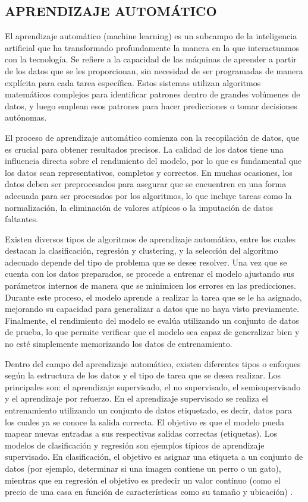\subsection{APRENDIZAJE AUTOMÁTICO}

El aprendizaje automático (machine learning) es un subcampo de la inteligencia artificial que ha transformado profundamente la manera en la que interactuamos con la tecnología. Se refiere a la capacidad de las máquinas de aprender a partir de los datos que se les proporcionan, sin necesidad de ser programadas de manera explícita para cada tarea específica. Estos sistemas utilizan algoritmos matemáticos complejos para identificar patrones dentro de grandes volúmenes de datos, y luego emplean esos patrones para hacer predicciones o tomar decisiones autónomas.

El proceso de aprendizaje automático comienza con la recopilación de datos, que es crucial para obtener resultados precisos. La calidad de los datos tiene una influencia directa sobre el rendimiento del modelo, por lo que es fundamental que los datos sean representativos, completos y correctos. En muchas ocasiones, los datos deben ser preprocesados para asegurar que se encuentren en una forma adecuada para ser procesados por los algoritmos, lo que incluye tareas como la normalización, la eliminación de valores atípicos o la imputación de datos faltantes.

Existen diversos tipos de algoritmos de aprendizaje automático, entre los cuales destacan la clasificación, regresión y clustering, y la selección del algoritmo adecuado depende del tipo de problema que se desee resolver. Una vez que se cuenta con los datos preparados, se procede a entrenar el modelo ajustando sus parámetros internos de manera que se minimicen los errores en las predicciones. Durante este proceso, el modelo aprende a realizar la tarea que se le ha asignado, mejorando su capacidad para generalizar a datos que no haya visto previamente. Finalmente, el rendimiento del modelo se evalúa utilizando un conjunto de datos de prueba, lo que permite verificar que el modelo sea capaz de generalizar bien y no esté simplemente memorizando los datos de entrenamiento.

Dentro del campo del aprendizaje automático, existen diferentes tipos o enfoques según la estructura de los datos y el tipo de tarea que se desea realizar. Los principales son: el aprendizaje supervisado, el no supervisado, el semisupervisado y el aprendizaje por refuerzo. En el aprendizaje supervisado se realiza el entrenamiento utilizando un conjunto de datos etiquetado, es decir, datos para los cuales ya se conoce la salida correcta. El objetivo es que el modelo pueda mapear nuevas entradas a sus respectivas salidas correctas (etiquetas). Los modelos de clasificación y regresión son ejemplos típicos de aprendizaje supervisado. En clasificación, el objetivo es asignar una etiqueta a un conjunto de datos (por ejemplo, determinar si una imagen contiene un perro o un gato), mientras que en regresión el objetivo es predecir un valor continuo (como el precio de una casa en función de características como su tamaño y ubicación) .

